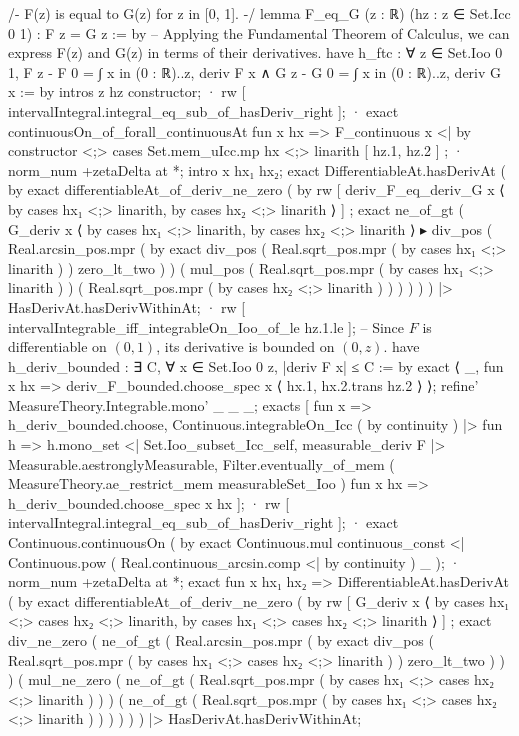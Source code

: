 /-
F(z) is equal to G(z) for z in [0, 1].
-/
lemma F_eq_G (z : ℝ) (hz : z ∈ Set.Icc 0 1) : F z = G z := by
  -- Applying the Fundamental Theorem of Calculus, we can express F(z) and G(z) in terms of their derivatives.
  have h_ftc : ∀ z ∈ Set.Ioo 0 1, F z - F 0 = ∫ x in (0 : ℝ)..z, deriv F x ∧ G z - G 0 = ∫ x in (0 : ℝ)..z, deriv G x := by
    intros z hz
    constructor;
    · rw [ intervalIntegral.integral_eq_sub_of_hasDeriv_right ];
      · exact continuousOn_of_forall_continuousAt fun x hx => F_continuous x <| by constructor <;> cases Set.mem_uIcc.mp hx <;> linarith [ hz.1, hz.2 ] ;
      · norm_num +zetaDelta at *;
        intro x hx₁ hx₂; exact DifferentiableAt.hasDerivAt ( by exact differentiableAt_of_deriv_ne_zero ( by rw [ deriv_F_eq_deriv_G x ⟨ by cases hx₁ <;> linarith, by cases hx₂ <;> linarith ⟩ ] ; exact ne_of_gt ( G_deriv x ⟨ by cases hx₁ <;> linarith, by cases hx₂ <;> linarith ⟩ ▸ div_pos ( Real.arcsin_pos.mpr ( by exact div_pos ( Real.sqrt_pos.mpr ( by cases hx₁ <;> linarith ) ) zero_lt_two ) ) ( mul_pos ( Real.sqrt_pos.mpr ( by cases hx₁ <;> linarith ) ) ( Real.sqrt_pos.mpr ( by cases hx₂ <;> linarith ) ) ) ) ) ) |> HasDerivAt.hasDerivWithinAt;
      · rw [ intervalIntegrable_iff_integrableOn_Ioo_of_le hz.1.le ];
        -- Since $F$ is differentiable on $(0, 1)$, its derivative is bounded on $(0, z)$.
        have h_deriv_bounded : ∃ C, ∀ x ∈ Set.Ioo 0 z, |deriv F x| ≤ C := by
          exact ⟨ _, fun x hx => deriv_F_bounded.choose_spec x ⟨ hx.1, hx.2.trans hz.2 ⟩ ⟩;
        refine' MeasureTheory.Integrable.mono' _ _ _;
        exacts [ fun x => h_deriv_bounded.choose, Continuous.integrableOn_Icc ( by continuity ) |> fun h => h.mono_set <| Set.Ioo_subset_Icc_self, measurable_deriv F |> Measurable.aestronglyMeasurable, Filter.eventually_of_mem ( MeasureTheory.ae_restrict_mem measurableSet_Ioo ) fun x hx => h_deriv_bounded.choose_spec x hx ];
    · rw [ intervalIntegral.integral_eq_sub_of_hasDeriv_right ];
      · exact Continuous.continuousOn ( by exact Continuous.mul continuous_const <| Continuous.pow ( Real.continuous_arcsin.comp <| by continuity ) _ );
      · norm_num +zetaDelta at *;
        exact fun x hx₁ hx₂ => DifferentiableAt.hasDerivAt ( by exact differentiableAt_of_deriv_ne_zero ( by rw [ G_deriv x ⟨ by cases hx₁ <;> cases hx₂ <;> linarith, by cases hx₁ <;> cases hx₂ <;> linarith ⟩ ] ; exact div_ne_zero ( ne_of_gt ( Real.arcsin_pos.mpr ( by exact div_pos ( Real.sqrt_pos.mpr ( by cases hx₁ <;> cases hx₂ <;> linarith ) ) zero_lt_two ) ) ) ( mul_ne_zero ( ne_of_gt ( Real.sqrt_pos.mpr ( by cases hx₁ <;> cases hx₂ <;> linarith ) ) ) ( ne_of_gt ( Real.sqrt_pos.mpr ( by cases hx₁ <;> cases hx₂ <;> linarith ) ) ) ) ) ) |> HasDerivAt.hasDerivWithinAt;
